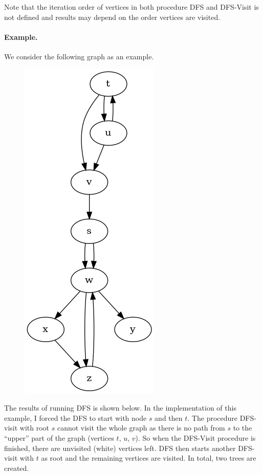 Note that the iteration order of vertices in both procedure DFS and DFS-Visit is not defined and results may depend on the order vertices are visited.

\paragraph{Example.} We consider the following graph as an example.

\begin{figure}[H]
\centering
\includegraphics[scale=0.4]{images/dfs_01.png}
\end{figure}

The results of running DFS is shown below. In the implementation of this example, I forced the DFS to start with node $s$ and then $t$. The procedure DFS-visit with root $s$ cannot visit the whole graph as there is no path from $s$ to the ``upper'' part of the graph (vertices $t$, $u$, $v$). So when the DFS-Visit procedure is finished, there are unvisited (white) vertices left. DFS then starts another DFS-visit with $t$ as root and the remaining vertices are visited. In total, two trees are created.

